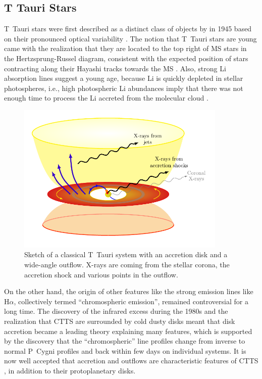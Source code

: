 \subsection{T Tauri Stars}
T~Tauri stars were first described as a distinct class of objects  by \citeauthor{Joy_1945} in 1945 based on their pronounced optical variability \citep{Joy_1945}. The notion that T~Tauri stars are young came with the realization that they are located to the top right of  MS stars in the Hertzsprung-Russel diagram, consistent with the expected position of stars contracting along their Hayashi tracks towards the MS \citep{Hayashi_1961}. Also, strong Li absorption lines suggest a young age, because Li is quickly depleted in stellar photospheres, i.e., high photospheric Li abundances imply that there was not enough time to process the Li accreted from the molecular cloud \citep{Magazzu_1992}.
%
%
\begin{figure}[t]
\centering
\includegraphics[width=10cm]{sketches/ctts.pdf}
\caption{Sketch of a classical T~Tauri system with an accretion disk and a wide-angle outflow. X-rays are coming from the stellar corona, the accretion shock and various points in the outflow. \label{fig:ctts_sketch}}
\end{figure}
%
On the other hand, the origin of other features like the strong emission lines like H$\alpha$, collectively termed “chromospheric emission”, remained controversial for a long time. The discovery of the infrared excess during the 1980s and the realization that CTTS are surrounded by cold dusty disks meant that disk accretion became a leading theory explaining many features, which is supported by the discovery that the ``chromospheric'' line profiles change from inverse to normal P~Cygni profiles and back within few days on individual systems. It is now well accepted that accretion 
and outflows are characteristic features of CTTS \cite{Bertout_2007}, in addition to their protoplanetary disks.

